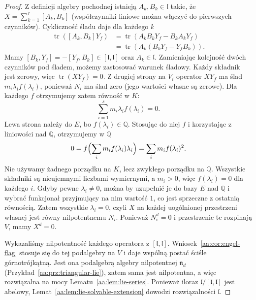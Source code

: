 \begin{proof}
Z definicji algebry pochodnej istnieją
$A_k,B_k\in\mathfrak l$ takie, że
$X=\sum_{k=1}^r[A_k,B_k]$ (współczynniki liniowe
można włączyć do pierwszych czynników).
Cykliczność śladu daje dla każdego $k$
\[
\begin{aligned}
 \operatorname{tr}([A_k,B_k]Y_f)
 &=\operatorname{tr}(A_kB_kY_f-B_kA_kY_f)\\
 &=\operatorname{tr}(A_k(B_kY_f-Y_fB_k)).
\end{aligned}
\]
Mamy $[B_k,Y_f]=-[Y_f,B_k]\in[\mathfrak l,\mathfrak l]$
oraz $A_k\in\mathfrak l$. Zamieniając kolejność
dwóch czynników pod śladem, możemy zastosować
warunek śladowy. Każdy składnik jest zerowy, więc
$\operatorname{tr}(XY_f)=0$.
Z drugiej strony na $V_i$ operator $XY_f$
ma ślad $m_i\lambda_i f(\lambda_i)$, ponieważ
$N_i$ ma ślad zero (jego wartości własne są zerowe).
Dla każdego $f$ otrzymujemy zatem równość w $K$:
\[
 \sum_{i=1}^s m_i\lambda_i f(\lambda_i)=0.
\]
Lewa strona należy do $E$, bo $f(\lambda_i)\in\mathbb Q$.
Stosując do niej $f$ i korzystając z liniowości
nad $\mathbb Q$, otrzymujemy w $\mathbb Q$
\[
 0=f\Bigl(\sum_i m_i f(\lambda_i)\lambda_i\Bigr)
   =\sum_i m_i f(\lambda_i)^2.
\]
Nie używamy żadnego porządku na $K$, lecz zwykłego
porządku na $\mathbb Q$. Wszystkie składniki
są nieujemnymi liczbami wymiernymi, a $m_i>0$,
więc $f(\lambda_i)=0$ dla każdego $i$.
Gdyby pewne $\lambda_i\ne0$, można by uzupełnić
je do bazy $E$ nad $\mathbb Q$ i wybrać funkcjonał
przyjmujący na nim wartość $1$, co jest sprzeczne
z ostatnią równością. Zatem wszystkie $\lambda_i=0$,
czyli $X$ na każdej uogólnionej przestrzeni własnej
jest równy nilpotentnemu $N_i$. Ponieważ $N_i^d=0$
i przestrzenie te rozpinają $V$, mamy $X^d=0$.

Wykazaliśmy nilpotentność każdego operatora z
$[\mathfrak l,\mathfrak l]$. Wniosek~\ref{aa:cor:engel-flag}
stosuje się do tej podalgebry na $V$ i daje wspólną
postać ściśle górnotrójkątną. Jest ona podalgebrą
algebry nilpotentnej $\mathfrak n_d$
(Przykład~\ref{aa:prz:triangular-lie}), zatem sama
jest nilpotentna, a więc rozwiązalna na mocy
Lematu~\ref{aa:lem:lie-series}. Ponieważ iloraz
$\mathfrak l/[\mathfrak l,\mathfrak l]$ jest abelowy,
Lemat~\ref{aa:lem:lie-solvable-extension} dowodzi
rozwiązalności $\mathfrak l$.
\end{proof}

